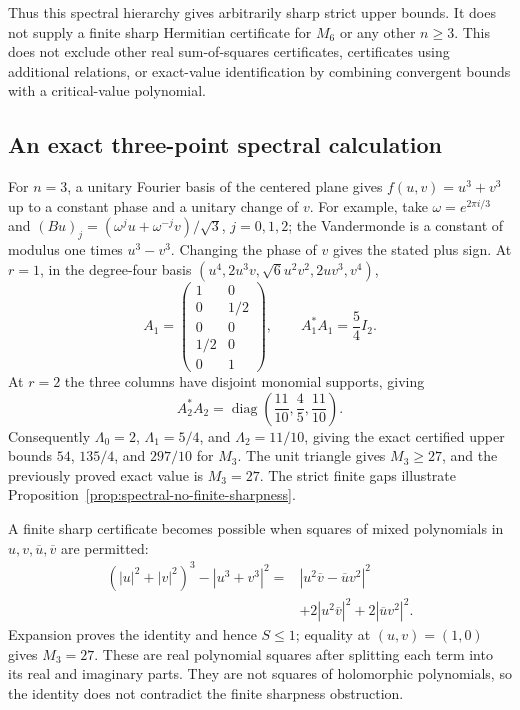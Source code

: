 \documentclass[11pt]{article}
\theoremstyle{remark}
\numberwithin{equation}{section}
\begin{document}
Thus this spectral hierarchy gives arbitrarily sharp strict upper
bounds. It does not supply a finite sharp Hermitian certificate for
$M_6$ or any other $n\ge3$. This does not exclude other real
sum-of-squares certificates, certificates using additional
relations, or exact-value identification by combining convergent
bounds with a critical-value polynomial.

\subsection{An exact three-point spectral calculation}
For $n=3$, a unitary Fourier basis of the centered plane gives
$f(u,v)=u^3+v^3$ up to a constant phase and a unitary change of $v$.
For example, take $\omega=e^{2\pi i/3}$ and
$(Bu)_j=(\omega^ju+\omega^{-j}v)/\sqrt3$, $j=0,1,2$;
the Vandermonde is a constant of modulus one times $u^3-v^3$.
Changing the phase of $v$ gives the stated plus sign.
At $r=1$, in the degree-four basis
$(u^4,2u^3v,\sqrt6u^2v^2,2uv^3,v^4)$,
\[
 A_1=\begin{pmatrix}
 1&0\\0&1/2\\0&0\\1/2&0\\0&1
 \end{pmatrix},\qquad
 A_1^*A_1=\frac54I_2.
\]
At $r=2$ the three columns have disjoint monomial supports, giving
\[
 A_2^*A_2=\operatorname{diag}\left(\frac{11}{10},
                           \frac45,\frac{11}{10}\right).
\]
Consequently $\Lambda_0=2$, $\Lambda_1=5/4$, and
$\Lambda_2=11/10$, giving the exact certified upper bounds
$54$, $135/4$, and $297/10$ for $M_3$. The unit triangle gives
$M_3\ge27$, and the previously proved exact value is $M_3=27$.
The strict finite gaps illustrate
Proposition~\ref{prop:spectral-no-finite-sharpness}.

A finite sharp certificate becomes possible when squares of mixed
polynomials in $u,v,\overline u,\overline v$ are permitted:
\begin{equation}\label{eq:three-real-sos}
\begin{split}
 (|u|^2+|v|^2)^3-|u^3+v^3|^2
 ={}&|u^2\overline v-\overline u v^2|^2\\
 &+2|u^2\overline v|^2+2|\overline u v^2|^2.
\end{split}
\end{equation}
Expansion proves the identity and hence $S\le1$; equality at
$(u,v)=(1,0)$ gives $M_3=27$. These are real polynomial squares
after splitting each term into its real and imaginary parts.
They are not squares of holomorphic polynomials, so the identity
does not contradict the finite sharpness obstruction.
\end{document}
